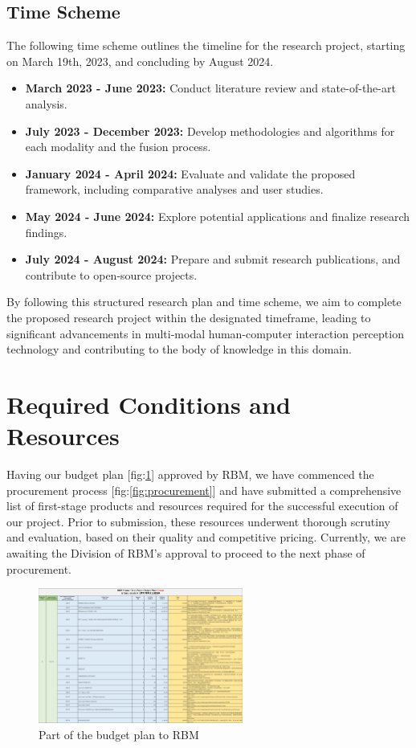 \documentclass[12pt, a4paper]{article}
\newcommand{\figref}[1]{[fig:\ref{#1}]}
\begin{document}
\subsection{Time Scheme}

The following time scheme outlines the timeline for the research project, starting on March 19th, 2023, and concluding by August 2024.

\begin{itemize}
	\item \textbf{March 2023 - June 2023:} Conduct literature review and state-of-the-art analysis.
	\item \textbf{July 2023 - December 2023:} Develop methodologies and algorithms for each modality and the fusion process.
	\item \textbf{January 2024 - April 2024:} Evaluate and validate the proposed framework, including comparative analyses and user studies.
	\item \textbf{May 2024 - June 2024:} Explore potential applications and finalize research findings.
	\item \textbf{July 2024 - August 2024:} Prepare and submit research publications, and contribute to open-source projects.
\end{itemize}

By following this structured research plan and time scheme, we aim to complete the proposed research project within the designated timeframe, leading to significant advancements in multi-modal human-computer interaction perception technology and contributing to the body of knowledge in this domain.

\newpage
\section{Required Conditions and Resources}
Having our budget plan \figref{fig:budget_plan} approved by RBM, we have commenced the procurement process \figref{fig:procurement} and have submitted a comprehensive list of first-stage products and resources required for the successful execution of our project. Prior to submission, these resources underwent thorough scrutiny and evaluation, based on their quality and competitive pricing. Currently, we are awaiting the Division of RBM's approval to proceed to the next phase of procurement.

\begin{figure}[ht!]
    \centering
    \includegraphics[width=0.6\textwidth]{image/budget_plan.pdf}
    \caption{Part of the budget plan to RBM}
    \label{fig:budget_plan}
\end{figure}
\end{document}
